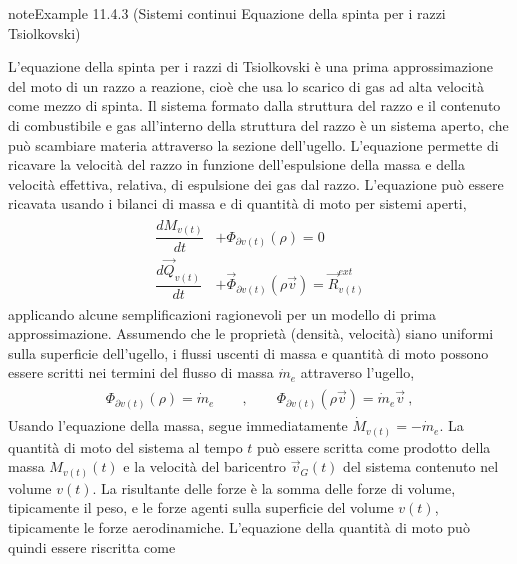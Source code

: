\documentclass[letterpaper,10pt,italian]{jupyterBook}
\begin{document}
\begin{sphinxadmonition}{note}{Example 11.4.3 (Sistemi continui \sphinxhyphen{} Equazione della spinta per i razzi \sphinxhyphen{} Tsiolkovski)}



\sphinxAtStartPar
L’equazione della spinta per i razzi \sphinxhyphen{} di Tsiolkovski   \sphinxhyphen{} è una prima approssimazione del moto di un razzo a reazione, cioè che usa lo scarico di gas ad alta velocità come mezzo di spinta. Il sistema formato dalla struttura del razzo e il contenuto di combustibile e gas all’interno della struttura del razzo è un sistema aperto, che può scambiare materia attraverso la sezione dell’ugello. L’equazione permette di ricavare la velocità del razzo in funzione dell’espulsione della massa e della velocità effettiva, relativa, di espulsione dei gas dal razzo. L’equazione può essere ricavata usando i bilanci di massa e di quantità di moto per sistemi aperti,
\begin{equation*}
\begin{split}\begin{aligned}
  \dfrac{d M_{v(t)}}{dt} & + \Phi_{\partial v(t)}(\rho) = 0 \\
  \dfrac{d \vec{Q}_{v(t)}}{dt} & + \vec{\Phi}_{\partial v(t)}(\rho \vec{v}) = \vec{R}_{v(t)}^{ext}
\end{aligned}\end{split}
\end{equation*}
\sphinxAtStartPar
applicando alcune semplificazioni ragionevoli per un modello di prima approssimazione. Assumendo che le proprietà (densità, velocità) siano uniformi sulla superficie dell’ugello, i flussi uscenti di massa e quantità di moto possono essere scritti nei termini del flusso di massa \(\dot{m}_e\) attraverso l’ugello,
\begin{equation*}
\begin{split}\begin{aligned}
  \Phi_{\partial v(t)}(\rho) = \dot{m}_e \qquad , \qquad \Phi_{\partial v(t)}(\rho \vec{v}) = \dot{m}_e \vec{v} \ ,
\end{aligned}\end{split}
\end{equation*}
\sphinxAtStartPar
Usando l’equazione della massa, segue immediatamente \(\dot{M}_{v(t)} = - \dot{m}_e\).
La quantità di moto del sistema al tempo \(t\) può essere scritta come prodotto della massa \(M_{v(t)}(t)\) e la velocità del baricentro \(\vec{v}_G(t)\) del sistema contenuto nel volume \(v(t)\). La risultante delle forze è la somma delle forze di volume, tipicamente il peso, e le forze agenti sulla superficie del volume \(v(t)\), tipicamente le forze aerodinamiche. L’equazione della quantità di moto può quindi essere riscritta come

\end{sphinxadmonition}
\end{document}
